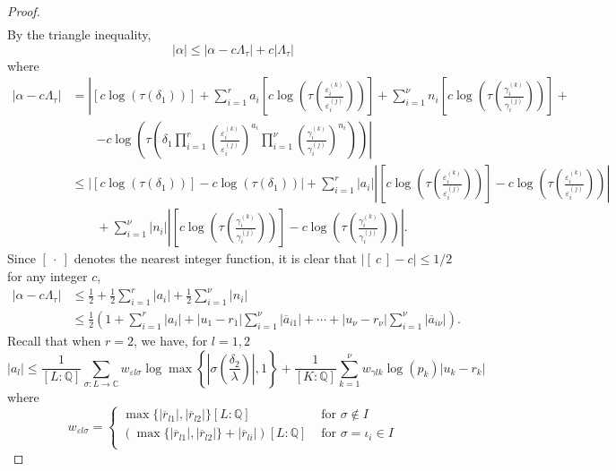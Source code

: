 \begin{proof}
\begin{align*}
\end{align*}
By the triangle inequality, 
\[|\alpha| \leq |\alpha - c\Lambda_{\tau}| + c|\Lambda_{\tau}|\]
where
\begin{align*}
|\alpha-c\Lambda_\tau|
	& = \left|[c\log(\tau(\delta_1))] +\sum_{i = 1}^r a_i \left[c\log\left(\tau\left(\frac{\varepsilon_i^{(k)}}{\varepsilon_i^{(j)}}\right)\right)\right] + \sum_{i = 1}^{\nu} n_i \left[c\log\left(\tau\left(\frac{\gamma_i^{(k)}}{\gamma_i^{(j)}}\right)\right)\right]\right. +\\
	& \quad \quad \left. - c \log\left(\tau\left(\delta_1 \prod_{i = 1}^r\left( \frac{\varepsilon_i^{(k)}}{\varepsilon_i^{(j)}}\right)^{a_i}\prod_{i = 1}^{\nu} \left( \frac{\gamma_i^{(k)}}{\gamma_i^{(j)}}\right)^{n_i}\right)\right)\right|\\
	& \leq \left| [c\log(\tau(\delta_1))] - c\log\left(\tau\left(\delta_1\right)\right)\right| + \sum_{i = 1}^r |a_i|\left| \left[c\log\left(\tau\left(\frac{\varepsilon_i^{(k)}}{\varepsilon_i^{(j)}}\right)\right)\right] - c\log\left(\tau\left( \frac{\varepsilon_i^{(k)}}{\varepsilon_i^{(j)}}\right) \right)\right| \\
	& \quad \quad +  \sum_{i = 1}^{\nu} |n_i|\left| \left[c\log\left(\tau\left(\frac{\gamma_i^{(k)}}{\gamma_i^{(j)}}\right)\right)\right] - c\log \left(\tau\left( \frac{\gamma_i^{(k)}}{\gamma_i^{(j)}}\right)\right)\right|.
\end{align*}
Since $[ \ \cdot \ ]$ denotes the nearest integer function, it is clear that $|[ \ c \ ] - c| \leq 1/2$ for any integer $c$, 
\begin{align*}
|\alpha-c\Lambda_\tau|
	& \leq \frac{1}{2} + \frac{1}{2}\sum_{i = 1}^r |a_i| + \frac{1}{2}\sum_{i = 1}^{\nu} |n_i|\\
	& \leq \frac{1}{2}\left(1 + \sum_{i = 1}^r |a_i| + |u_1-r_1|\sum_{i=1}^{\nu}|\overline{a}_{i1}| + \cdots + |u_{\nu} - r_{\nu}| \sum_{i=1}^{\nu}|\overline{a}_{i\nu}|\right).
\end{align*}
Recall that when $r = 2$, we have, for $l = 1,2$
\[|a_l| \leq \frac{1}{[L:\mathbb{Q}]}\sum_{\sigma :L \to \mathbb{C}} w_{\varepsilon l \sigma}\log \max \left\{ \left|\sigma\left(\frac{\delta_2}{\lambda}\right)\right|, 1\right\} + \frac{1}{[K:\mathbb{Q}]}\sum_{k = 1}^{\nu} w_{\gamma l k}\log(p_k)|u_k - r_k|\]
where
\[w_{\varepsilon l \sigma} = 
\begin{cases}
\max\{|\overline{r}_{l1}|, |\overline{r}_{l2}|\}[L:\mathbb{Q}] & \text{ for } \sigma \notin I\\
\left(\max\{|\overline{r}_{l1}|, |\overline{r}_{l2}|\} + |\overline{r}_{li}|\right)[L:\mathbb{Q}] & \text{ for } \sigma = \iota_i \in I\\

\end{cases}\]
\end{proof}
